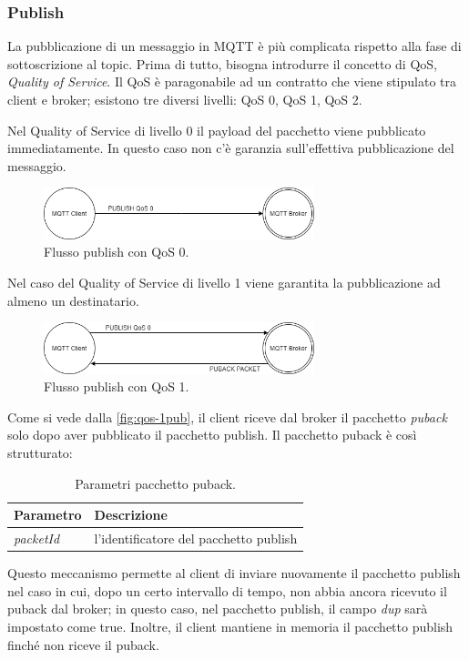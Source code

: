 \documentclass[binding=0.6cm,TFA]{sapthesis}
\begin{document}
\begin{large}
\subsubsection{Publish}
La pubblicazione di un messaggio in MQTT è più complicata rispetto alla fase di sottoscrizione al topic. Prima di tutto, bisogna introdurre il concetto di QoS, \textit{Quality of Service}. Il QoS è paragonabile ad un contratto che viene stipulato tra client e broker; esistono tre diversi livelli: QoS 0, QoS 1, QoS 2.


Nel Quality of Service di livello 0 il payload del pacchetto viene pubblicato immediatamente. In questo caso non c'è garanzia sull'effettiva pubblicazione del messaggio.
\begin{figure}[h]
\centering
\includegraphics[width=0.7\textwidth]{images/publish-qos0.png}
\caption{Flusso publish con QoS 0.}
\label{fig:qos-0pub}
\end{figure}

Nel caso del Quality of Service di livello 1 viene garantita la pubblicazione ad almeno un destinatario.
\begin{figure}[h]
\centering
\includegraphics[width=0.7\textwidth]{images/publish-qos1.png}
\caption{Flusso publish con QoS 1.}
\label{fig:qos-1pub}
\end{figure}

Come si vede dalla \autoref{fig:qos-1pub}, il client riceve dal broker il pacchetto \textit{puback} solo dopo aver pubblicato il pacchetto publish. 
Il pacchetto puback è così strutturato:
\begin{table}[h]
\caption{Parametri pacchetto puback.}
\label{tab:puback}
\begin{tabular}{lp{}}
\toprule
\textbf{Parametro} & \textbf{Descrizione} \\
\midrule
\textit{packetId} & l'identificatore del pacchetto publish \\
\bottomrule
\end{tabular}
\end{table}

Questo meccanismo permette al client di inviare nuovamente il pacchetto publish nel caso in cui, dopo un certo intervallo di tempo, non abbia ancora ricevuto il puback dal broker; in questo caso, nel pacchetto publish, il campo \textit{dup} sarà impostato come true. Inoltre, il client mantiene in memoria il pacchetto publish finché non riceve il puback.


\end{large}
\end{document}
